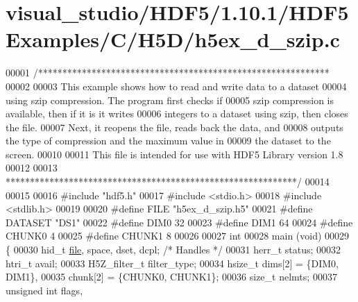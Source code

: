\hypertarget{visual__studio_2_h_d_f5_21_810_81_2_h_d_f5_examples_2_c_2_h5_d_2h5ex__d__szip_8c_source}{}\section{visual\+\_\+studio/\+H\+D\+F5/1.10.1/\+H\+D\+F5\+Examples/\+C/\+H5\+D/h5ex\+\_\+d\+\_\+szip.c}
\label{visual__studio_2_h_d_f5_21_810_81_2_h_d_f5_examples_2_c_2_h5_d_2h5ex__d__szip_8c_source}

\begin{DoxyCode}
00001 \textcolor{comment}{/************************************************************}
00002 \textcolor{comment}{}
00003 \textcolor{comment}{  This example shows how to read and write data to a dataset}
00004 \textcolor{comment}{  using szip compression.    The program first checks if}
00005 \textcolor{comment}{  szip compression is available, then if it is it writes}
00006 \textcolor{comment}{  integers to a dataset using szip, then closes the file.}
00007 \textcolor{comment}{  Next, it reopens the file, reads back the data, and}
00008 \textcolor{comment}{  outputs the type of compression and the maximum value in}
00009 \textcolor{comment}{  the dataset to the screen.}
00010 \textcolor{comment}{}
00011 \textcolor{comment}{  This file is intended for use with HDF5 Library version 1.8}
00012 \textcolor{comment}{}
00013 \textcolor{comment}{ ************************************************************/}
00014 
00015 
00016 \textcolor{preprocessor}{#include "hdf5.h"}
00017 \textcolor{preprocessor}{#include <stdio.h>}
00018 \textcolor{preprocessor}{#include <stdlib.h>}
00019 
00020 \textcolor{preprocessor}{#define FILE            "h5ex\_d\_szip.h5"}
00021 \textcolor{preprocessor}{#define DATASET         "DS1"}
00022 \textcolor{preprocessor}{#define DIM0            32}
00023 \textcolor{preprocessor}{#define DIM1            64}
00024 \textcolor{preprocessor}{#define CHUNK0          4}
00025 \textcolor{preprocessor}{#define CHUNK1          8}
00026 
00027 \textcolor{keywordtype}{int}
00028 main (\textcolor{keywordtype}{void})
00029 \{
00030     hid\_t           \hyperlink{structfile}{file}, space, dset, dcpl;    \textcolor{comment}{/* Handles */}
00031     herr\_t          status;
00032     htri\_t          avail;
00033     H5Z\_filter\_t    filter\_type;
00034     hsize\_t         dims[2] = \{DIM0, DIM1\},
00035                     chunk[2] = \{CHUNK0, CHUNK1\};
00036     \textcolor{keywordtype}{size\_t}          nelmts;
00037     \textcolor{keywordtype}{unsigned} \textcolor{keywordtype}{int}    flags,

\end{DoxyCode}
